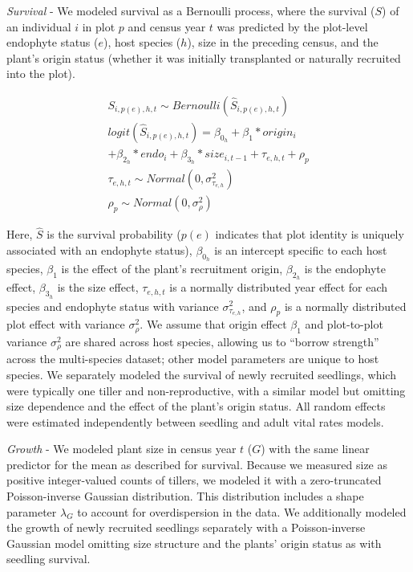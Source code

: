 \documentclass[9pt,twocolumn,twoside]{pnas-new}
\begin{document}
{\emph{Survival} - We modeled survival as a Bernoulli process, where the survival ($S$) of an individual $i$ in plot $p$ and census year $t$ was predicted by the plot-level endophyte status ($e$), host species ($h$), size in the preceding census, and the plant's origin status (whether it was initially transplanted or naturally recruited into the plot).

\begin{subequations}
	\label{eq:survival}
	\begin{align}
		S_{i,p(e),h,t} \sim Bernoulli(\hat{S}_{i,p(e),h,t})\\
		logit(\hat{S}_{i,p(e),h,t}) = \beta_{0_{h}} + \beta_{1}*origin_{i}\\
		 + \beta_{2_{h}}*endo_{i} + \beta_{3_{h}}*size_{i,t-1} + \tau_{e,h,t} + \rho_{p}\\
		\tau_{e,h,t} \sim Normal(0,\sigma^2_{\tau_{e,h}})\\
		\rho_{p} \sim Normal(0,\sigma^2_{\rho})
	\end{align}
\end{subequations}

Here, $\hat{S}$ is the survival probability ($p(e)$ indicates that plot identity is uniquely associated with an endophyte status), $\beta_{0_{h}}$ is an intercept specific to each host species, $\beta_1$ is the effect of the plant's recruitment origin, $\beta_{2_{h}}$ is the endophyte effect, $\beta_{3_{h}}$ is the size effect, $\tau_{e,h,t}$ is a normally distributed year effect for each species and endophyte status with variance $\sigma^2_{\tau_{e,h}}$, and $\rho_{p}$ is a normally distributed plot effect with variance $\sigma^2_{\rho}$.
We assume that origin effect $\beta_1$ and plot-to-plot variance $\sigma^2_{\rho}$ are shared across host species, allowing us to ``borrow strength'' across the multi-species dataset; other model parameters are unique to host species. 
We separately modeled the survival of newly recruited seedlings, which were typically one tiller and non-reproductive, with a similar model but omitting size dependence and the effect of the plant's origin status. 
All random effects were estimated independently between seedling and adult vital rates models.


\emph{Growth} - We modeled plant size in census year $t$ ($G$) with the same linear predictor for the mean as described for survival.
Because we measured size as positive integer-valued counts of tillers, we modeled it with a zero-truncated Poisson-inverse Gaussian distribution.
This distribution includes a shape parameter $\lambda_G$ to account for overdispersion in the data.
We additionally modeled the growth of newly recruited seedlings separately with a Poisson-inverse Gaussian model omitting size structure and the plants' origin status as with seedling survival.

}
\end{document}
